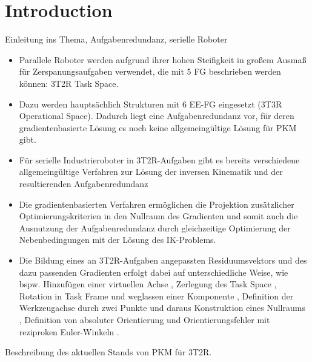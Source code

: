 \documentclass[robotics,article,submit,moreauthors,pdftex]{Definitions/mdpi}
\begin{document}

\section{Introduction}

Einleitung ins Thema, Aufgabenredundanz, serielle Roboter
\begin{itemize}
	\item Parallele Roboter werden aufgrund ihrer hohen Steifigkeit in großem Ausmaß für Zerspanungsaufgaben verwendet, die mit 5 FG beschrieben werden können: 3T2R Task Space.
	\item Dazu werden hauptsächlich Strukturen mit 6 EE-FG eingesetzt (3T3R Operational Space). Dadurch liegt eine Aufgabenredundanz vor, für deren gradientenbasierte Lösung es noch keine allgemeingültige Lösung für PKM gibt.
	\item Für serielle Industrieroboter in 3T2R-Aufgaben gibt es bereits verschiedene allgemeingültige Verfahren zur Lösung der inversen Kinematik und der resultierenden Aufgabenredundanz \cite{Baron2000,HuoBar2005,Zlajpah2017,LegerAng2016,ZhuQuCaoYan2013,GuoDonKe2015,MousaviGagBouRay2018,1_SchapplerTapOrt2019}
	\item Die gradientenbasierten Verfahren \cite{Baron2000,HuoBar2005,Zlajpah2017,LegerAng2016,1_SchapplerTapOrt2019} ermöglichen die Projektion zusätzlicher Optimierungskriterien in den Nullraum des Gradienten und somit auch die Ausnutzung der Aufgabenredundanz durch gleichzeitige Optimierung der Nebenbedingungen mit der Lösung des IK-Problems.
	\item Die Bildung eines an 3T2R-Aufgaben angepassten Residuumsvektors und des dazu passenden Gradienten erfolgt dabei auf unterschiedliche Weise, wie bspw. Hinzufügen einer virtuellen Achse \cite{Baron2000}, Zerlegung des Task Space \cite{HuoBar2005}, Rotation in Task Frame und weglassen einer Komponente \cite{Zlajpah2017}, Definition der Werkzeugachse durch zwei Punkte und daraus Konstruktion eines Nullraums \cite{LegerAng2016}, Definition von absoluter Orientierung und Orientierungsfehler mit reziproken Euler-Winkeln \cite{1_SchapplerTapOrt2019}.
\end{itemize}

Beschreibung des aktuellen Stands von PKM für 3T2R.
\end{document}

